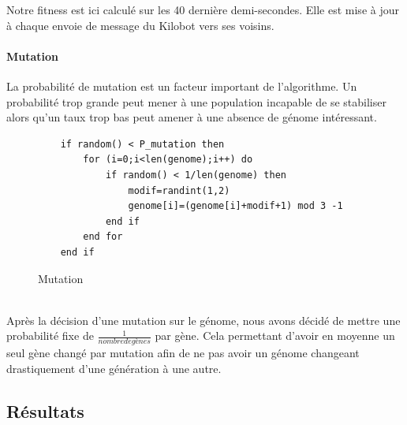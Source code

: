 \documentclass[a4paper]{article}
\begin{document}
Notre fitness est ici calculé sur les 40 dernière demi-secondes. Elle est mise à jour à chaque envoie de message du Kilobot vers ses voisins.
\paragraph{Mutation}  La probabilité de mutation est un facteur important de l'algorithme. Un probabilité trop grande peut mener à une population incapable de se stabiliser alors qu'un taux trop bas peut amener à une absence de génome intéressant.
\begin{figure}[h!]
	\centering
	\begin{lstlisting}
	if random() < P_mutation then
		for (i=0;i<len(genome);i++) do
			if random() < 1/len(genome) then
				modif=randint(1,2)
				genome[i]=(genome[i]+modif+1) mod 3 -1
			end if
		end for
	end if
	\end{lstlisting}
	\caption{Mutation}
\end{figure}
\\ Après la décision d'une mutation sur le génome, nous avons décidé de mettre une probabilité fixe de $\frac{1}{nombre de gènes}$ par gène. Cela permettant d'avoir en moyenne un seul gène changé par mutation afin de ne pas avoir un génome changeant drastiquement d'une génération à une autre.
\newpage


\subsection{Résultats}
\end{document}
